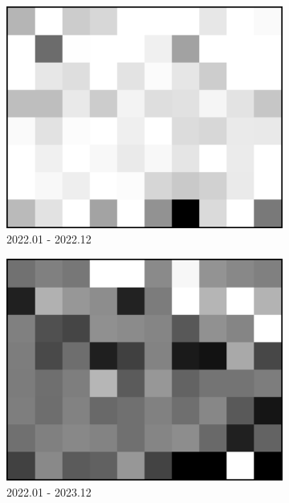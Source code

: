 \documentclass[preprint, authoryear]{elsarticle}
\begin{document}
\begin{figure}
\begin{subfigure}{0.3\textwidth}
        \includegraphics[width=\textwidth]{figure/The azimuth shift/shift_Milan_asc_20221223.png}
        \caption{2022.01 - 2022.12}
        \label{fig_7b}
    \end{subfigure}
    \begin{subfigure}{0.3\textwidth}
        \centering
        \includegraphics[width=\textwidth]{figure/The azimuth shift/shift_Milan_asc_20231230.png}
        \caption{2022.01 - 2023.12}
        \label{fig_7c}
    \end{subfigure}
    \hfill
    \begin{subfigure}{0.3\textwidth}

\end{subfigure}
\end{figure}
\end{document}
